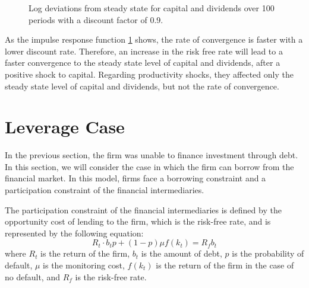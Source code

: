 \documentclass[12pt]{report}
\begin{document}
\begin{figure}[!h]
    \centering
    \caption{Log deviations from steady state for capital and dividends over 100 periods with a discount factor of 0.9.}
    \label{fig:impulse_response2}
\end{figure}
As the impulse response function \ref{fig:impulse_response2} shows, the rate of convergence is faster with a lower discount rate. Therefore,
an increase in the risk free rate will lead to a faster convergence to the steady state level of capital and dividends,
after a positive shock to capital.
Regarding productivity shocks, they affected only the steady state level of capital and dividends, but not the rate of convergence.

\section{Leverage Case}

In the previous section, the firm was unable to finance investment through debt. In this section, we will consider the
case in which the firm can borrow from the financial market. In this model, firms face a borrowing constraint and a
participation constraint of the financial intermediaries.  

The participation constraint of the financial intermediaries is defined by the opportunity cost of lending to the firm,
which is the risk-free rate, and is represented by the following equation: 
\begin{equation}
    R_t \cdot b_t p + (1-p) \mu f(k_t) = R_f b_t \label{eq:partecipation}
\end{equation}
where \(R_t\) is the return of the firm, \(b_t\) is the amount of debt, \(p\) is the probability of default, \(\mu\) is
the monitoring cost, \(f(k_t)\) is the return of the firm in the case of no default, and \(R_f\) is the risk-free rate.  
\end{document}
